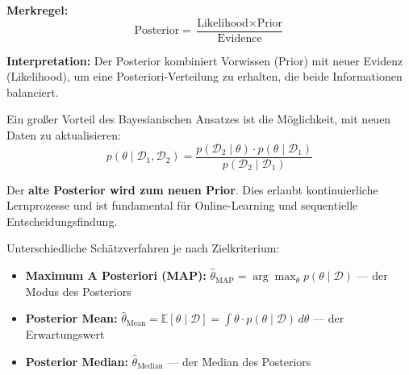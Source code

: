 \textbf{Merkregel:}
$$\boxed{\text{Posterior} = \frac{\text{Likelihood} \times \text{Prior}}{\text{Evidence}}}$$

\textbf{Interpretation:} Der Posterior kombiniert Vorwissen (Prior) mit neuer Evidenz (Likelihood), um eine Posteriori-Verteilung zu erhalten, die beide Informationen balanciert.

Ein großer Vorteil des Bayesianischen Ansatzes ist die Möglichkeit, mit neuen Daten zu aktualisieren:
$$p(\theta \mid \mathcal{D}_1, \mathcal{D}_2) = \frac{p(\mathcal{D}_2 \mid \theta) \cdot p(\theta \mid \mathcal{D}_1)}{p(\mathcal{D}_2 \mid \mathcal{D}_1)}$$

Der \textbf{alte Posterior wird zum neuen Prior}. Dies erlaubt kontinuierliche Lernprozesse und ist fundamental für Online-Learning und sequentielle Entscheidungsfindung.


Unterschiedliche Schätzverfahren je nach Zielkriterium:
\begin{itemize}[leftmargin=1.5em]
    \item \textbf{Maximum A Posteriori (MAP):} $\hat{\theta}_{\text{MAP}} = \arg\max_\theta p(\theta \mid \mathcal{D})$ — der Modus des Posteriors
    \item \textbf{Posterior Mean:} $\hat{\theta}_{\text{Mean}} = \mathbb{E}[\theta \mid \mathcal{D}] = \int \theta \cdot p(\theta \mid \mathcal{D}) \, d\theta$ — der Erwartungswert
    \item \textbf{Posterior Median:} $\hat{\theta}_{\text{Median}}$ — der Median des Posteriors
\end{itemize}

